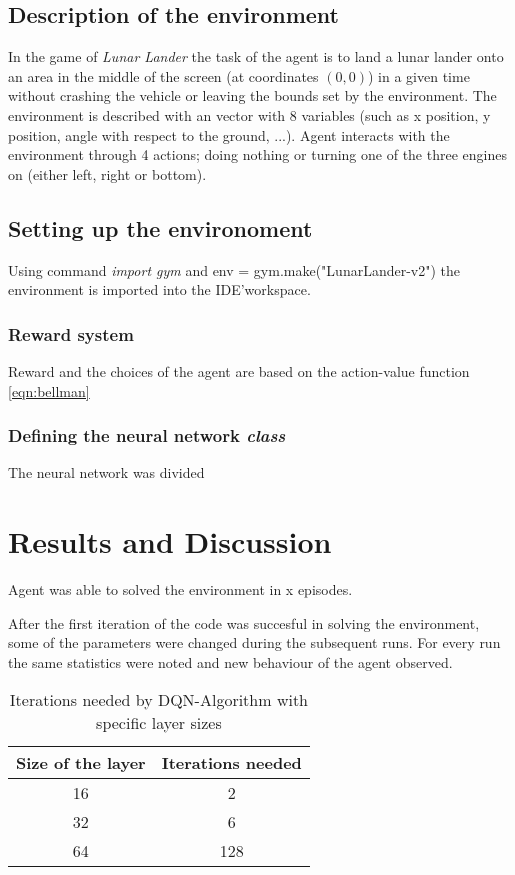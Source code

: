 \documentclass{article}
\begin{document}
\subsection{Description of the environment}
In the game of \textit{Lunar Lander} the task of the agent is to land a lunar lander onto an area in the middle of the screen (at coordinates $(0,0)$) in a given time without crashing the vehicle or leaving the bounds set by the environment. The environment is described with an vector with 8 variables (such as x position, y position, angle with respect to the ground, ...). Agent interacts with the environment through 4 actions; doing nothing or turning one of the three engines on (either left, right or bottom).

\subsection{Setting up the environoment}
Using command \textit{import gym} and env = gym.make("LunarLander-v2") the environment is imported into the IDE'\footnotemark \space workspace.

\subsubsection{Reward system}
Reward and the choices of the agent are based on the action-value function \ref{eqn:bellman}

\subsubsection{Defining the neural network \textit{class}}
The neural network was divided

\newpage
\section*{Results and Discussion}
Agent was able to solved the environment in x episodes.

After the first iteration of the code was succesful in solving the environment, some of the parameters were changed during the subsequent runs. For every run the same statistics were noted and new behaviour of the agent observed.

\begin{table}[h]
\caption{Iterations needed by DQN-Algorithm with specific layer sizes}
\label{tab:table1}
\centering
\begin{tabular}{cc}
  \hline
  \textbf{Size of the layer} & \textbf{Iterations needed} \\
  \hline
  16 & 2 \\
  32 & 6 \\
  64 & 128 \\
  \hline
\end{tabular}
\end{table}
\end{document}
